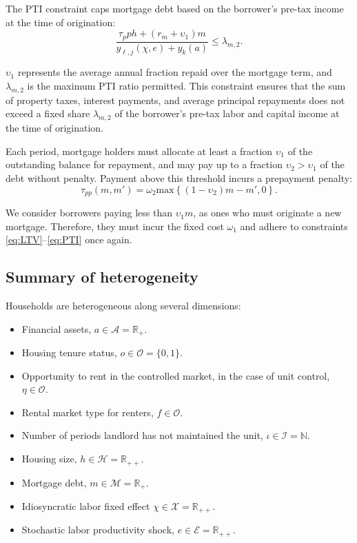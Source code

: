 \documentclass[parskip=full]{article}
\begin{document}
\noindent The PTI constraint caps mortgage debt based on the borrower's pre-tax income at the time of origination: 
\begin{equation}\label{eq:PTI}
\frac{\tau_{p}ph+(r_{m}+\upsilon_{1})m}{y_{\ell,j}(\chi,e)+y_{k}(a)} \leq \lambda_{m,2}.
\end{equation}

\noindent $\upsilon_{1}$ represents the average annual fraction repaid over the mortgage term, and $\lambda_{m,2}$ is the maximum PTI ratio permitted. This constraint ensures that the sum of property taxes, interest payments, and average principal repayments does not exceed a fixed share $\lambda_{m,2}$ of the borrower's pre-tax labor and capital income at the time of origination.

Each period, mortgage holders must allocate at least a fraction $\upsilon_{1}$ of the outstanding balance for repayment, and may pay up to a fraction $\upsilon_{2}>\upsilon_{1}$ of the debt without penalty. Payment above this threshold incurs a prepayment penalty:
\begin{equation}\label{eq:prepayment_penalty}
\tau_{pp}(m,m')=\omega_{2}\mbox{max}\left\{(1-\upsilon_{2})m-m',0\right\}.
\end{equation}

\noindent We consider borrowers paying less than $\upsilon_{1}m$, as ones who must originate a new mortgage. Therefore, they must incur the fixed cost $\omega_{1}$ and adhere to constraints \eqref{eq:LTV}--\eqref{eq:PTI} once again.

\subsection{Summary of heterogeneity}

Households are heterogeneous along several dimensions:

\begin{itemize}
    \item Financial assets, $a\in \mathcal{A}=\mathbb{R}_{+}$.
    \item Housing tenure status, $o \in \mathcal{O}=\{0,1\}$.
    \item Opportunity to rent in the controlled market, in the case of unit control, $\eta \in \mathcal{O}$.
    \item Rental market type for renters, $f \in \mathcal{O}$.
    \item Number of periods landlord has not maintained the unit, $\iota \in \mathcal{I}=\mathbb{N}$.
    \item Housing size, $h\in \mathcal{H}=\mathbb{R}_{++}$.
    \item Mortgage debt, $m \in \mathcal{M}=\mathbb{R}_{+}$.
    \item Idiosyncratic labor fixed effect $\chi \in \mathcal{X}=\mathbb{R}_{++}$.
    \item Stochastic labor productivity shock, $e \in \mathcal{E} = \mathbb{R}_{++}$.
\end{itemize}
 
\end{document}
